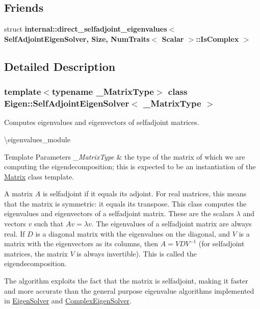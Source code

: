 \subsection*{Friends}
\begin{DoxyCompactItemize}
\item 
\mbox{\label{class_eigen_1_1_self_adjoint_eigen_solver_ac6b52963cfee7ba77cf9f2314b29546b}} 
struct {\bfseries internal\+::direct\+\_\+selfadjoint\+\_\+eigenvalues$<$ Self\+Adjoint\+Eigen\+Solver, Size, Num\+Traits$<$ Scalar $>$\+::\+Is\+Complex $>$}
\end{DoxyCompactItemize}


\subsection{Detailed Description}
\subsubsection*{template$<$typename \+\_\+\+Matrix\+Type$>$\newline
class Eigen\+::\+Self\+Adjoint\+Eigen\+Solver$<$ \+\_\+\+Matrix\+Type $>$}

Computes eigenvalues and eigenvectors of selfadjoint matrices. 

\textbackslash{}eigenvalues\+\_\+module


\begin{DoxyTemplParams}{Template Parameters}
{\em \+\_\+\+Matrix\+Type} & the type of the matrix of which we are computing the eigendecomposition; this is expected to be an instantiation of the \mbox{\hyperlink{class_eigen_1_1_matrix}{Matrix}} class template.\\
\hline
\end{DoxyTemplParams}
A matrix $ A $ is selfadjoint if it equals its adjoint. For real matrices, this means that the matrix is symmetric\+: it equals its transpose. This class computes the eigenvalues and eigenvectors of a selfadjoint matrix. These are the scalars $ \lambda $ and vectors $ v $ such that $ Av = \lambda v $. The eigenvalues of a selfadjoint matrix are always real. If $ D $ is a diagonal matrix with the eigenvalues on the diagonal, and $ V $ is a matrix with the eigenvectors as its columns, then $ A = V D V^{-1} $ (for selfadjoint matrices, the matrix $ V $ is always invertible). This is called the eigendecomposition.

The algorithm exploits the fact that the matrix is selfadjoint, making it faster and more accurate than the general purpose eigenvalue algorithms implemented in \mbox{\hyperlink{class_eigen_1_1_eigen_solver}{Eigen\+Solver}} and \mbox{\hyperlink{class_eigen_1_1_complex_eigen_solver}{Complex\+Eigen\+Solver}}.


